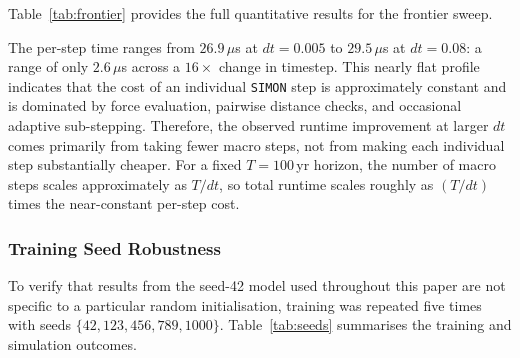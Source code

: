 \documentclass[12pt]{article}
\begin{document}
Table~\ref{tab:frontier} provides the full quantitative results for the frontier sweep.

\begin{table}[H]
\centering
\caption{Speed-accuracy frontier results for \texttt{SIMON} with adaptive
sub-stepping, $T = 100$\,yr. \texttt{ias15} baseline: $0.080$\,s total,
$\lambda = 0.1655$\,yr$^{-1}$ at $dt = 0.04$\,yr. Bold row = operational timestep.}
\label{tab:frontier}
\end{table}

The per-step time ranges from $26.9\,\mu$s at $dt = 0.005$ to $29.5\,\mu$s at
$dt = 0.08$: a range of only $2.6\,\mu$s across a $16\times$ change in timestep.
This nearly flat profile indicates that the cost of an individual \texttt{SIMON}
step is approximately constant and is dominated by force evaluation, pairwise
distance checks, and occasional adaptive sub-stepping. Therefore, the observed
runtime improvement at larger $dt$ comes primarily from taking fewer macro steps,
not from making each individual step substantially cheaper. For a fixed
$T = 100$\,yr horizon, the number of macro steps scales approximately as $T/dt$,
so total runtime scales roughly as $(T/dt)$ times the near-constant per-step cost.

\subsubsection{Training Seed Robustness}
\label{sec:seed_robustness}

To verify that results from the seed-42 model used throughout this paper are
not specific to a particular random initialisation, training was repeated five times
with seeds $\{42, 123, 456, 789, 1000\}$. Table~\ref{tab:seeds} summarises the
training and simulation outcomes.
\end{document}
